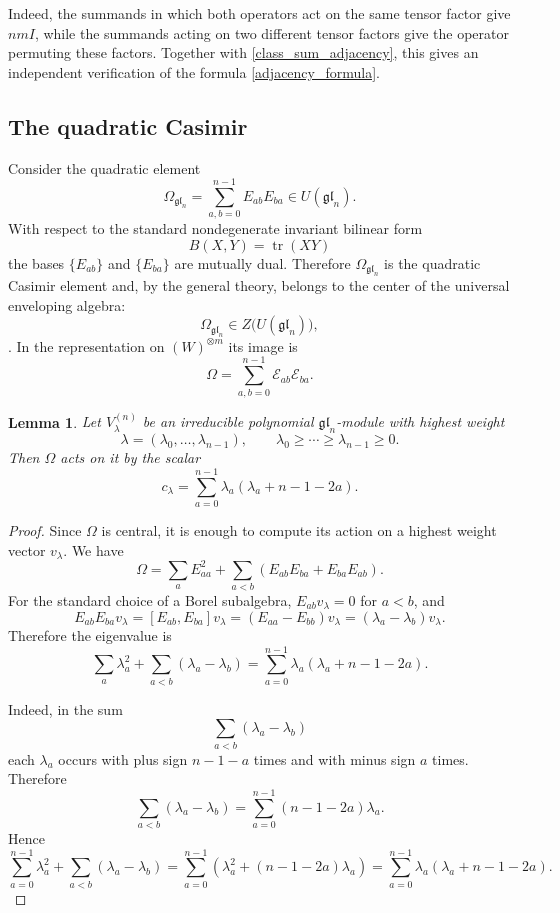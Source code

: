 \documentclass[12pt,reqno]{amsart}
\newtheorem{lemma}[theorem]{Lemma}
\begin{document}
Indeed, the summands in which both operators act on the same tensor factor
give $nmI$, while the summands acting on two different tensor factors give
the operator permuting these factors. Together with
\eqref{class_sum_adjacency}, this gives an independent verification of
the formula \eqref{adjacency_formula}.




\subsection{The quadratic Casimir}

Consider the quadratic element
$$
\Omega_{\mathfrak{gl}_n}
=
\sum_{a,b=0}^{n-1}E_{ab}E_{ba}
\in U(\mathfrak{gl}_n).
$$
With respect to the standard nondegenerate invariant bilinear form
$$
B(X,Y)=\operatorname{tr}(XY)
$$
the bases $\{E_{ab}\}$ and $\{E_{ba}\}$ are mutually dual. Therefore
$\Omega_{\mathfrak{gl}_n}$ is the quadratic Casimir element and, by the
general theory, belongs to the center of the universal enveloping algebra:
$$
\Omega_{\mathfrak{gl}_n}
\in Z\bigl(U(\mathfrak{gl}_n)\bigr),
$$
\cite{Humphreys,FultonHarris}.
In the representation on
$(W)^{\otimes m}$ its image is
$$
\Omega
=
\sum_{a,b=0}^{n-1}\mathcal E_{ab}\mathcal E_{ba}.
$$

\begin{lemma}\label{lem:casimir_eigenvalue}
Let $V_\lambda^{(n)}$ be an irreducible polynomial
$\mathfrak{gl}_n$-module with highest weight
$$
\lambda=(\lambda_0,\dots,\lambda_{n-1}),
\qquad
\lambda_0\ge\cdots\ge\lambda_{n-1}\ge0.
$$
Then $\Omega$ acts on it by the scalar
\begin{equation}\label{eq:casimir_eigenvalue}
c_\lambda
=
\sum_{a=0}^{n-1}
\lambda_a(\lambda_a+n-1-2a).
\end{equation}
\end{lemma}

\begin{proof}
Since $\Omega$ is central, it is enough to compute its action on a highest
weight vector $v_\lambda$. We have
$$
\Omega
=
\sum_aE_{aa}^2
+
\sum_{a<b}(E_{ab}E_{ba}+E_{ba}E_{ab}).
$$
For the standard choice of a Borel subalgebra,
$E_{ab}v_\lambda=0$ for $a<b$, and
$$
E_{ab}E_{ba}v_\lambda
=
[E_{ab},E_{ba}]v_\lambda
=
(E_{aa}-E_{bb})v_\lambda
=
(\lambda_a-\lambda_b)v_\lambda.
$$
Therefore the eigenvalue is
$$
\sum_a\lambda_a^2+
\sum_{a<b}(\lambda_a-\lambda_b)
=
\sum_{a=0}^{n-1}
\lambda_a(\lambda_a+n-1-2a).
$$

Indeed, in the sum
$$
\sum_{a<b}(\lambda_a-\lambda_b)
$$
each $\lambda_a$ occurs with plus sign $n-1-a$ times and with minus sign
$a$ times. Therefore
$$
\sum_{a<b}(\lambda_a-\lambda_b)
=
\sum_{a=0}^{n-1}(n-1-2a)\lambda_a.
$$
Hence
$$
\sum_{a=0}^{n-1}\lambda_a^2+
\sum_{a<b}(\lambda_a-\lambda_b)
=
\sum_{a=0}^{n-1}
\left(
\lambda_a^2+(n-1-2a)\lambda_a
\right)
=
\sum_{a=0}^{n-1}
\lambda_a(\lambda_a+n-1-2a).
$$

\end{proof}
\end{document}
